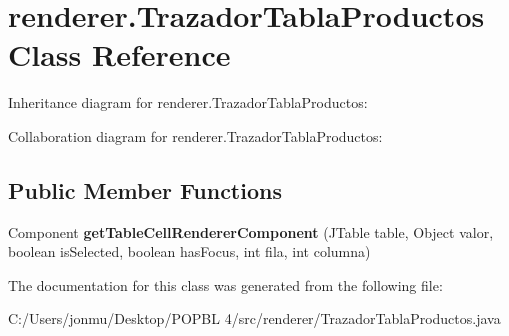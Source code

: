 \hypertarget{classrenderer_1_1_trazador_tabla_productos}{}\section{renderer.\+Trazador\+Tabla\+Productos Class Reference}
\label{classrenderer_1_1_trazador_tabla_productos}


Inheritance diagram for renderer.\+Trazador\+Tabla\+Productos\+:


Collaboration diagram for renderer.\+Trazador\+Tabla\+Productos\+:
\subsection*{Public Member Functions}
\begin{DoxyCompactItemize}
\item 
\mbox{\label{classrenderer_1_1_trazador_tabla_productos_a0d15ae9262431f81b66258d7f445092c}} 
Component {\bfseries get\+Table\+Cell\+Renderer\+Component} (J\+Table table, Object valor, boolean is\+Selected, boolean has\+Focus, int fila, int columna)
\end{DoxyCompactItemize}


The documentation for this class was generated from the following file\+:\begin{DoxyCompactItemize}
\item 
C\+:/\+Users/jonmu/\+Desktop/\+P\+O\+P\+B\+L 4/src/renderer/Trazador\+Tabla\+Productos.\+java\end{DoxyCompactItemize}
